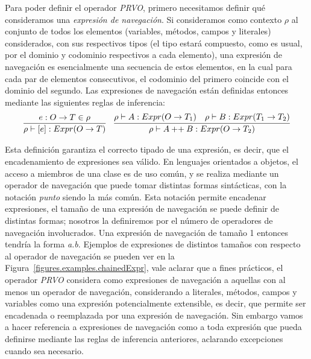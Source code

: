 Para poder definir el operador \emph{PRVO}, primero necesitamos definir qu\'e consideramos una \emph{expresi\'on de navegaci\'on}. Si consideramos como contexto $\rho$ al conjunto de todos los elementos (variables, m\'etodos, campos y literales) considerados, con sus respectivos tipos (el tipo estar\'a compuesto, como es usual, por el dominio y codominio respectivos a cada elemento), una expresi\'on de navegaci\'on es esencialmente una secuencia de estos elementos, en la cual para cada par de elementos consecutivos, el codominio del primero coincide con el dominio del segundo. Las expresiones de navegaci\'on est\'an definidas entonces mediante las siguientes reglas de inferencia:
\begin{displaymath}
\begin{array}{cc}
	\infer{\rho \vdash [e] : Expr(O \rightarrow T)}{
		e : O \rightarrow T \in \rho
	}
	&\infer{\rho \vdash A \:\textrm{++}\: B : Expr(O \rightarrow T_2)}{
		{\rho \vdash A : Expr(O \rightarrow T_1)}
		& {\rho \vdash B : Expr(T_1 \rightarrow T_2)}
	}
\end{array}
\end{displaymath}

Esta definici\'on garantiza el correcto tipado de una expresi\'on, es decir, que el encadenamiento de expresiones sea v\'alido. En lenguajes orientados a objetos, el acceso a miembros de una clase es de uso com\'un, y se realiza mediante un operador de navegaci\'on que puede tomar distintas formas sint\'acticas, con la notaci\'on \emph{punto} siendo la m\'as com\'un. Esta notaci\'on permite encadenar expresiones, el tama\~no de una expresi\'on de navegaci\'on se puede definir de distintas formas; nosotros la definiremos por el n\'umero de operadores de navegaci\'on involucrados. Una expresi\'on de navegaci\'on de tama\~no 1 entonces tendr\'ia la forma \emph{a.b}. Ejemplos de expresiones de distintos tama\~nos con respecto al operador de navegaci\'on se pueden ver en la Figura~\ref{figures.examples.chainedExpr}, vale aclarar que a fines pr\'acticos, el operador \emph{PRVO} considera como expresiones de navegaci\'on a aquellas con al menos un operador de navegaci\'on, considerando a literales, m\'etodos, campos y variables como una expresi\'on potencialmente extensible, es decir, que permite ser encadenada o reemplazada por una expresi\'on de navegaci\'on. Sin embargo vamos a hacer referencia a expresiones de navegaci\'on como a toda expresi\'on que pueda definirse mediante las reglas de inferencia anteriores, aclarando excepciones cuando sea necesario.

